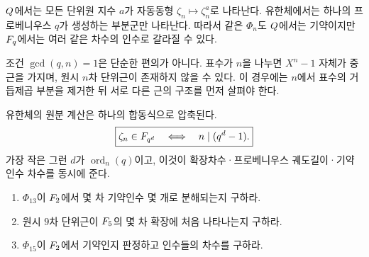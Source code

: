 $Q$에서는 모든 단위원 지수 $a$가 자동동형 $\zeta_n\mapsto\zeta_n^a$로 나타난다. 유한체에서는 하나의 프로베니우스 $q$가 생성하는 부분군만 나타난다. 따라서 같은 $\Phi_n$도 $Q$에서는 기약이지만 $F_q$에서는 여러 같은 차수의 인수로 갈라질 수 있다.

\begin{remark}
조건 $\gcd(q,n)=1$은 단순한 편의가 아니다. 표수가 $n$을 나누면 $X^n-1$ 자체가 중근을 가지며, 원시 $n$차 단위근이 존재하지 않을 수 있다. 이 경우에는 $n$에서 표수의 거듭제곱 부분을 제거한 뒤 서로 다른 근의 구조를 먼저 살펴야 한다.
\end{remark}

\begin{keyidea}
유한체의 원분 계산은 하나의 합동식으로 압축된다.
\[
  \boxed{
  \zeta_n\in F_{q^d}
  \quad\Longleftrightarrow\quad
  n\mid(q^d-1).}
\]
가장 작은 그런 $d$가 $\operatorname{ord}_n(q)$이고, 이것이 확장차수·프로베니우스 궤도길이·기약인수 차수를 동시에 준다.
\end{keyidea}

\begin{checkpoint}
\begin{enumerate}[label=(\alph*)]
  \item $\Phi_{13}$이 $F_2$에서 몇 차 기약인수 몇 개로 분해되는지 구하라.
  \item 원시 $9$차 단위근이 $F_5$의 몇 차 확장에 처음 나타나는지 구하라.
  \item $\Phi_{15}$이 $F_2$에서 기약인지 판정하고 인수들의 차수를 구하라.
\end{enumerate}
\end{checkpoint}
